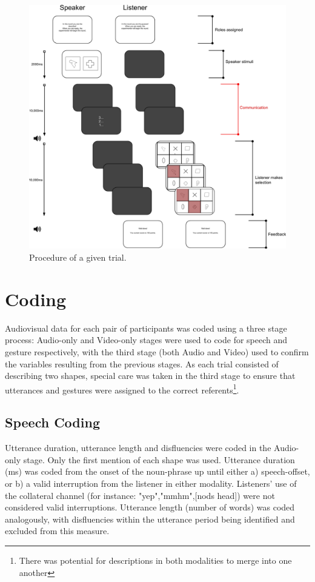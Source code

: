 \documentclass[a4paper,man,natbib]{apa6}
\begin{document}
\begin{figure}
  \centering
	\includegraphics[width=\linewidth]{trial.png}
  \caption{Procedure of a given trial.}
  \label{fig:trial}
\end{figure}

\section{Coding}
Audiovisual data for each pair of participants was coded using a three stage process:
Audio-only and Video-only stages were used to code for speech and gesture respectively, with the third stage (both Audio and Video) used to confirm the variables resulting from the previous stages.
As each trial consisted of describing two shapes, special care was taken in the third stage to ensure that utterances and gestures were assigned to the correct referents\footnote{There was potential for descriptions in both modalities to merge into one another}.


\subsection{Speech Coding}
Utterance duration, utterance length and disfluencies were coded in the Audio-only stage.
Only the first mention of each shape was used. 
Utterance duration (ms) was coded from the onset of the noun-phrase up until either a) speech-offset, or b) a valid interruption from the listener in either modality.
Listeners' use of the collateral channel (for instance: "yep","mmhm",[nods head]) were not considered valid interruptions.
Utterance length (number of words) was coded analogously, with disfluencies within the utterance period being identified and excluded from this measure.
\end{document}
